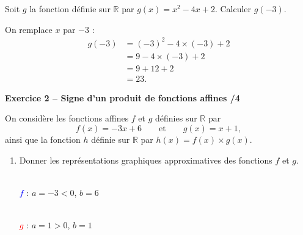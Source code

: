\documentclass[10pt,a4paper]{article}
\begin{document}
\begin{sujets}
Soit \(g\) la fonction définie sur \(\mathbb{R}\) par \(g(x)=x^2-4x+2\). Calculer \(g(-3)\).

On remplace \(x\) par \(-3\) :
\[
\begin{aligned}
g(-3) &= (-3)^2-4\times(-3)+2\\
      &= 9-4\times(-3)+2\\
      &= 9+12+2\\
      &= 23.
\end{aligned}
\]

\textbf{Exercice 2 -- Signe d'un produit de fonctions affines \hfill /4}

On considère les fonctions affines \(f\) et \(g\) définies sur \(\mathbb{R}\) par
\[
f(x)=-3x+6 \qquad\text{et}\qquad g(x)=x+1,
\]
ainsi que la fonction \(h\) définie sur \(\mathbb{R}\) par \(h(x)=f(x)\times g(x)\).

\begin{enumerate}
\item Donner les représentations graphiques approximatives des fonctions \(f\) et \(g\).

\begin{center}
\begin{minipage}{2.6cm}
\centering
{}\\[2pt]
{\scriptsize \textcolor{blue}{\(f\)} : \(a=-3<0\), \(b=6\)}
\end{minipage}
\hspace{0.3cm}
\begin{minipage}{2.6cm}
\centering
{}\\[2pt]
{\scriptsize \textcolor{red}{\(g\)} : \(a=1>0\), \(b=1\)}
\end{minipage}
\end{center}


\end{enumerate}
\end{sujets}
\end{document}
